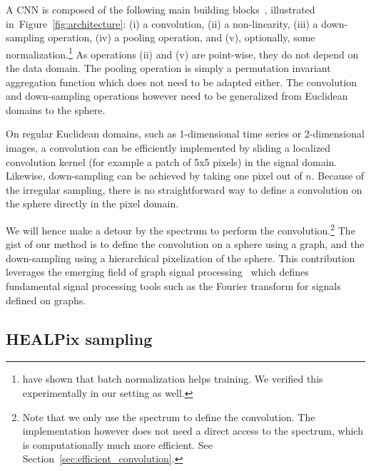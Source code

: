 \documentclass[final,twocolumn,3p,times,authoryear]{elsarticle}
\newcommand{\todo}[1]{{\color[rgb]{.6,.1,.6}{#1}}}
\newcommand{\figref}[1]{Figure~\ref{fig:#1}}
\newcommand{\secref}[1]{Section~\ref{sec:#1}}
\newcommand{\1}{\b{1}}              %
\newcommand{\0}{\b{0}}              %
\begin{document}
\todo{Should we give a more general / high-level description of a CNN?}

A CNN is composed of the following main building blocks~\citep{lecun1998cnn}, illustrated in~\figref{architecture}: (i) a convolution, (ii) a non-linearity, (iii) a down-sampling operation, (iv) a pooling operation, and (v), optionally, some normalization.\footnote{\citet{ioffe2015batchnorm} have shown that batch normalization helps training. We verified this experimentally in our setting as well.} As operations (ii) and (v) are point-wise, they do not depend on the data domain. The pooling operation is simply a permutation invariant aggregation function which does not need to be adapted either. The convolution and down-sampling operations however need to be generalized from Euclidean domains to the sphere.

On regular Euclidean domains, such as 1-dimensional time series or 2-dimensional images, a convolution can be efficiently implemented by sliding a localized convolution kernel (for example a patch of 5x5 pixels) in the signal domain. Likewise, down-sampling can be achieved by taking one pixel out of $n$.
Because of the irregular sampling, there is no straightforward way to define a convolution on the sphere directly in the pixel domain.

We will hence make a detour by the spectrum to perform the convolution.\footnote{Note that we only use the spectrum to define the convolution. The implementation however does not need a direct access to the spectrum, which is computationally much more efficient. See \secref{efficient_convolution}.}
The gist of our method is to define the convolution on a sphere using a graph, and the down-sampling using a hierarchical pixelization of the sphere.
This contribution leverages the emerging field of graph signal processing~\citep{shuman2013emerging} which defines fundamental signal processing tools such as the Fourier transform for signals defined on graphs.

\subsection{HEALPix sampling}
\label{sec:healpix}
\end{document}
